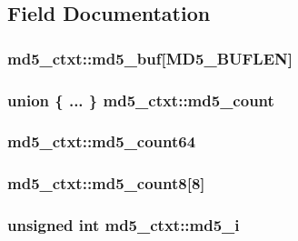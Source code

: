\subsection{Field Documentation}
\hypertarget{structmd5__ctxt_af33a6ae2188084f68a777f09db3a6c12}{
\subsubsection[{md5\-\_\-buf}]{ md5\-\_\-ctxt\-::md5\-\_\-buf\mbox{[}{\bf M\-D5\-\_\-\-B\-U\-F\-L\-E\-N}\mbox{]}}}\label{structmd5__ctxt_af33a6ae2188084f68a777f09db3a6c12}
\hypertarget{structmd5__ctxt_a17a80dc2308d86fd529e4ee3bfc6892d}{
\subsubsection[{md5\-\_\-count}]{\setlength{\rightskip}{0pt plus 5cm}union \{ ... \} 			 md5\-\_\-ctxt\-::md5\-\_\-count}}\label{structmd5__ctxt_a17a80dc2308d86fd529e4ee3bfc6892d}
\hypertarget{structmd5__ctxt_afe0283d08ff6dcf3e57076fd60511f73}{
\subsubsection[{md5\-\_\-count64}]{ md5\-\_\-ctxt\-::md5\-\_\-count64}}\label{structmd5__ctxt_afe0283d08ff6dcf3e57076fd60511f73}
\hypertarget{structmd5__ctxt_a1a4ecd8cf6c7b3f9ceda0eeb12892706}{
\subsubsection[{md5\-\_\-count8}]{ md5\-\_\-ctxt\-::md5\-\_\-count8\mbox{[}8\mbox{]}}}\label{structmd5__ctxt_a1a4ecd8cf6c7b3f9ceda0eeb12892706}
\hypertarget{structmd5__ctxt_af3502865669a9b4140fa45c87f415c24}{
\subsubsection[{md5\-\_\-i}]{\setlength{\rightskip}{0pt plus 5cm}unsigned int md5\-\_\-ctxt\-::md5\-\_\-i}}\label{structmd5__ctxt_af3502865669a9b4140fa45c87f415c24}
